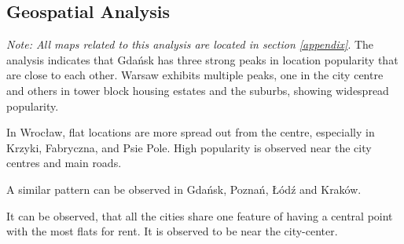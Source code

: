 \subsection{Geospatial Analysis}
\textit{Note: All maps related to this analysis are located in section \ref{appendix}}. The analysis indicates that Gdańsk has three strong peaks in location popularity that are close to each other. Warsaw exhibits multiple peaks, one in the city centre and others in tower block housing estates and the suburbs, showing widespread popularity. 

In Wrocław, flat locations are more spread out from the centre, especially in Krzyki, Fabryczna, and Psie Pole. High popularity is observed near the city centres and main roads.

A similar pattern can be observed in Gdańsk, Poznań, Łódź and Kraków.

It can be observed, that all the cities share one feature of having a central point with the most flats for rent. It is observed to be near the city-center.
